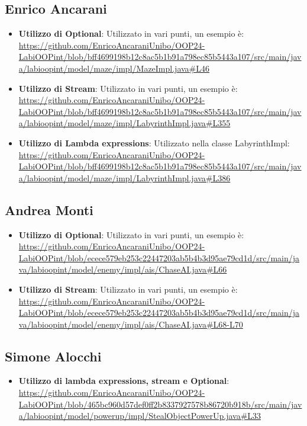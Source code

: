 \documentclass[a4paper,12pt]{report}
\begin{document}
\subsection{Enrico Ancarani}
\begin{itemize}
	\item \textbf{Utilizzo di Optional}: Utilizzato in vari punti, un esempio è: \url{https://github.com/EnricoAncaraniUnibo/OOP24-LabiOOPint/blob/bff4699198b12c8ac5b1b91a798ec85b5443a107/src/main/java/labioopint/model/maze/impl/MazeImpl.java#L46}
	\item \textbf{Utilizzo di Stream}: Utilizzato in vari punti, un esempio è: \url{https://github.com/EnricoAncaraniUnibo/OOP24-LabiOOPint/blob/bff4699198b12c8ac5b1b91a798ec85b5443a107/src/main/java/labioopint/model/maze/impl/LabyrinthImpl.java#L355}
	\item \textbf{Utilizzo di Lambda expressions}: Utilizzato nella classe LabyrinthImpl: \url{https://github.com/EnricoAncaraniUnibo/OOP24-LabiOOPint/blob/bff4699198b12c8ac5b1b91a798ec85b5443a107/src/main/java/labioopint/model/maze/impl/LabyrinthImpl.java#L386}
\end{itemize}

\subsection{Andrea Monti}
\begin{itemize}
	\item \textbf{Utilizzo di Optional}: Utilizzato in vari punti, un esempio è: \url{https://github.com/EnricoAncaraniUnibo/OOP24-LabiOOPint/blob/ecece579eb253c22447203ab5b4b3d95ae79cd1d/src/main/java/labioopint/model/enemy/impl/ais/ChaseAI.java#L66}
	\item \textbf{Utilizzo di Stream}: Utilizzato in vari punti, un esempio è: \url{https://github.com/EnricoAncaraniUnibo/OOP24-LabiOOPint/blob/ecece579eb253c22447203ab5b4b3d95ae79cd1d/src/main/java/labioopint/model/enemy/impl/ais/ChaseAI.java#L68-L70}
\end{itemize}

\subsection{Simone Alocchi}
\begin{itemize}
	\item \textbf{Utilizzo di lambda expressions, stream e Optional}: \url{https://github.com/EnricoAncaraniUnibo/OOP24-LabiOOPint/blob/465bc960d57def0ff2b8337927578b86720b918b/src/main/java/labioopint/model/powerup/impl/StealObjectPowerUp.java#L33}
\end{itemize}
\end{document}
